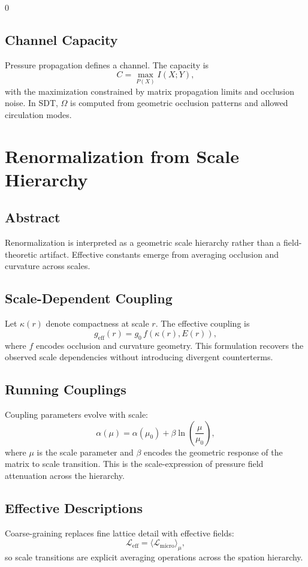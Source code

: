 0\documentclass[12pt]{book}
\begin{document}
\section{Channel Capacity}
Pressure propagation defines a channel. The capacity is
\begin{equation}
C = \max_{P(X)} I(X;Y),
\end{equation}
with the maximization constrained by matrix propagation limits and occlusion noise.
In SDT, $\Omega$ is computed from geometric occlusion patterns and allowed circulation modes.

\chapter{Renormalization from Scale Hierarchy}

\section*{Abstract}
Renormalization is interpreted as a geometric scale hierarchy rather than a field-theoretic artifact.
Effective constants emerge from averaging occlusion and curvature across scales.

\section{Scale-Dependent Coupling}
Let $\kappa(r)$ denote compactness at scale $r$. The effective coupling is
\begin{equation}
g_{\text{eff}}(r) = g_0\, f(\kappa(r), E(r)),
\end{equation}
where $f$ encodes occlusion and curvature geometry. This formulation recovers the observed scale
dependencies without introducing divergent counterterms.

\section{Running Couplings}
Coupling parameters evolve with scale:
\begin{equation}
\alpha(\mu) = \alpha(\mu_0) + \beta \ln\left(\frac{\mu}{\mu_0}\right),
\end{equation}
where $\mu$ is the scale parameter and $\beta$ encodes the geometric response of the matrix to scale
transition. This is the scale-expression of pressure field attenuation across the hierarchy.

\section{Effective Descriptions}
Coarse-graining replaces fine lattice detail with effective fields:
\begin{equation}
\mathcal{L}_{\text{eff}} = \langle \mathcal{L}_{\text{micro}} \rangle_{\mu},
\end{equation}
so scale transitions are explicit averaging operations across the spation hierarchy.
\end{document}
